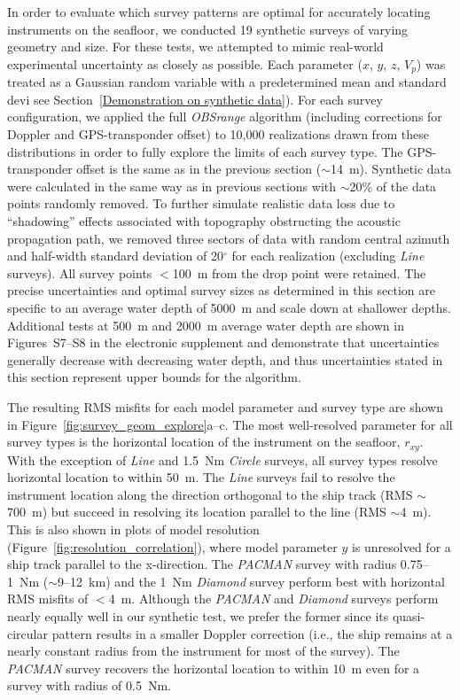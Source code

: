 In order to evaluate which survey patterns are optimal for accurately locating instruments on the seafloor, we conducted 19 synthetic surveys of varying geometry and size. For these tests, we attempted to mimic real-world experimental uncertainty as closely as possible. Each parameter ($x$, $y$, $z$, $V_p$) was treated as a Gaussian random variable with a predetermined mean and standard devi
see Section~\ref{Demonstration on synthetic data}). For each survey configuration, we applied the full \textit{OBSrange} algorithm (including corrections for Doppler and GPS-transponder offset) to 10,000 realizations drawn from these distributions in order to fully explore the limits of each survey type. The GPS-transponder offset is the same as in the previous section ($\sim$14~m). Synthetic data were calculated in the same way as in previous sections with $\sim$20\% of the data points randomly removed. To further simulate realistic data loss due to ``shadowing'' effects associated with topography obstructing the acoustic propagation path, we removed three sectors of data with random central azimuth and half-width standard deviation of 20$^{\circ}$ for each realization (excluding \textit{Line} surveys). All survey points $<$100~m from the drop point were retained. The precise uncertainties and optimal survey sizes as determined in this section are specific to an average water depth of 5000~m and scale down at shallower depths. Additional tests at 500~m and 2000~m average water depth are shown in Figures~S7--S8 in the electronic supplement and demonstrate that uncertainties generally decrease with decreasing water depth, and thus uncertainties stated in this section represent upper bounds for the algorithm.

The resulting RMS misfits for each model parameter and survey type are shown in Figure~\ref{fig:survey_geom_explore}a--c. The most well-resolved parameter for all survey types is the horizontal location of the instrument on the seafloor, $r_{xy}$. With the exception of \textit{Line} and 1.5~Nm \textit{Circle} surveys, all survey types resolve horizontal location to within 50~m. The \textit{Line} surveys fail to resolve the instrument location along the direction orthogonal to the ship track (RMS $\sim$700~m) but succeed in resolving its location parallel to the line (RMS $\sim$4~m). This is also shown in plots of model resolution (Figure~\ref{fig:resolution_correlation}), where model parameter $y$ is unresolved for a ship track parallel to the x-direction. The \textit{PACMAN} survey with radius 0.75--1~Nm ($\sim$9--12~km) and the 1~Nm \textit{Diamond} survey perform best with horizontal RMS misfits of $<$4~m. Although the \textit{PACMAN} and \textit{Diamond} surveys perform nearly equally well in our synthetic test, we prefer the former since its quasi-circular pattern results in a smaller Doppler correction (i.e., the ship remains at a nearly constant radius from the instrument for most of the survey). The \textit{PACMAN} survey recovers the horizontal location to within 10~m even for a survey with radius of 0.5~Nm.

